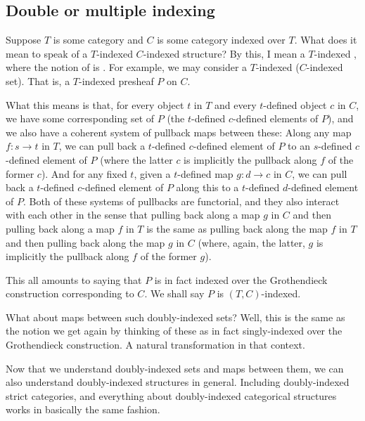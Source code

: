 \subsection{Double or multiple indexing}

Suppose $T$ is some category and $C$ is some category indexed over $T$. What does it mean to speak of a $T$-indexed $C$-indexed structure? By this, I mean a $T$-indexed , where the notion of  is . For example, we may consider a $T$-indexed ($C$-indexed set). That is, a $T$-indexed presheaf $P$ on $C$.

What this means is that, for every object $t$ in $T$ and every $t$-defined object $c$ in $C$, we have some corresponding set of $P$ (the $t$-defined $c$-defined elements of $P$), and we also have a coherent system of pullback maps between these: Along any map $f : s \to t$ in $T$, we can pull back a $t$-defined $c$-defined element of $P$ to an $s$-defined $c$-defined element of $P$ (where the latter $c$ is implicitly the pullback along $f$ of the former $c$). And for any fixed $t$, given a $t$-defined map $g : d \to c$ in $C$, we can pull back a $t$-defined $c$-defined element of $P$ along this to a $t$-defined $d$-defined element of $P$. Both of these systems of pullbacks are functorial, and they also interact with each other  in the sense that pulling back along a map $g$ in $C$ and then pulling back along a map $f$ in $T$ is the same as pulling back along the map $f$ in $T$ and then pulling back along the map $g$ in $C$ (where, again, the latter, $g$ is implicitly the pullback along $f$ of the former $g$).

This all amounts to saying that $P$ is in fact indexed over the Grothendieck construction corresponding to $C$. We shall say $P$ is $(T, C)$-indexed.

What about maps between such doubly-indexed sets? Well, this is the same as the notion we get again by thinking of these as in fact singly-indexed over the Grothendieck construction. A natural transformation in that context.

Now that we understand doubly-indexed sets and maps between them, we can also understand doubly-indexed structures in general. Including doubly-indexed strict categories, and everything about doubly-indexed categorical structures works in basically the same fashion.


